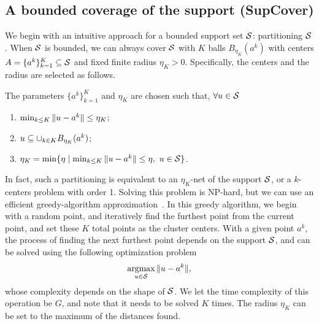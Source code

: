 \subsection{A bounded coverage of the support (SupCover)}
\label{sec:cover_sup}
We begin with an intuitive approach for a bounded support set $\mathcal{S}$: partitioning $\mathcal{S}$. 
When $\mathcal{S}$ is bounded, we can always cover $\mathcal{S}$ with $K$ balls $B_{\eta_K}(a^k)$ with centers $A = \{a^k\}_{k=1}^K \subseteq \mathcal{S}$ and fixed finite radius $\eta_K > 0$. Specifically, the centers and the radius are selected as follows.
\begin{assumption}\label{ass:balls}
The parameters $\{a^k\}_{k=1}^K$ and $\eta_K$ are chosen such that, $\forall u \in \mathcal{S}$
\begin{enumerate}
\item $\min_{k\leq K}\|u - a^k\| \leq \eta_K$;
\item $u \subseteq \cup_{k \in K} B_{\eta_K}(a^k)$;
\item $\eta_K = \min\{\eta \mid \min_{k\leq K}\|u - a^k\| \leq \eta,~u \in \mathcal{S}\}$.
\end{enumerate}
\end{assumption}
In fact, such a partitioning is equivalent to an $\eta_K$-net of the support $\mathcal{S}$, or a $k$-centers problem with order 1. 
Solving this problem is NP-hard, but we can use an efficient greedy-algorithm approximation~\cite{kcenters}.
In this greedy algorithm, we begin with a random point, and iteratively find the furthest point from the current point, and set these $K$ total points as the cluster centers. With a given point $a^k$, the process of finding the next furthest point depends on the support $\mathcal{S}$, and can be solved using the following optimization problem
$$ \mathop{\rm argmax}_{u\in \mathcal{S}}\|u-a^k\|,$$ whose complexity depends on the shape of $\mathcal{S}$. We let the time complexity of this operation be $G$, and note that it needs to be solved $K$ times. The radius $\eta_K$ can be set to the maximum of the distances found. 

